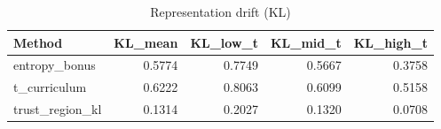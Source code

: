 \begin{table}[htbp]
\centering
\caption{Representation drift (KL)}
\label{tab:repr-drift}
\begin{tabular}{lrrrr}
\toprule
\textbf{Method} & \textbf{KL\_mean} & \textbf{KL\_low\_t} & \textbf{KL\_mid\_t} & \textbf{KL\_high\_t} \\
\midrule
entropy\_bonus & 0.5774 & 0.7749 & 0.5667 & 0.3758 \\
t\_curriculum & 0.6222 & 0.8063 & 0.6099 & 0.5158 \\
trust\_region\_kl & 0.1314 & 0.2027 & 0.1320 & 0.0708 \\
\bottomrule
\end{tabular}
\end{table}